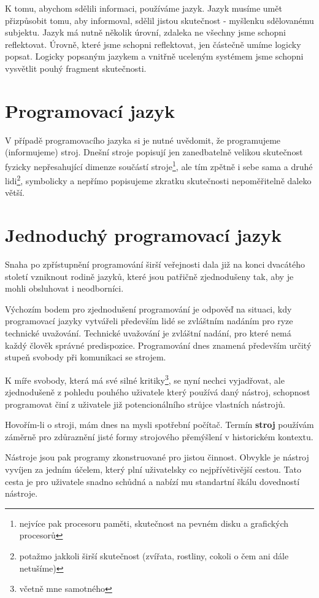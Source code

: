 \documentclass[11pt]{book}
\newcommand{\oddil}[1]{\section{#1}\label{sec:#1}}
\newcommand{\slovnik}[1]{\textbf{\gls{#1}}\index{#1}}
\begin{document}
K tomu, abychom sdělili informaci, používáme jazyk. Jazyk musíme umět přizpůsobit tomu, aby informoval, sdělil jistou skutečnost - myšlenku sdělovanému subjektu. Jazyk má nutně několik úrovní, zdaleka ne všechny jsme schopni reflektovat. Úrovně, které jsme schopni reflektovat, jen částečně umíme logicky popsat. Logicky popsaným jazykem a vnitřně uceleným systémem jsme schopni vysvětlit pouhý fragment skutečnosti.


\oddil{Programovací jazyk}

V případě programovacího jazyka si je nutné uvědomit, že programujeme (informujeme) stroj. Dnešní stroje popisují jen zanedbatelně velikou skutečnost fyzicky nepřesahující dimenze součástí stroje\footnote{nejvíce pak procesoru paměti, skutečnost na pevném disku a grafických procesorů}, ale tím zpětně i sebe sama a druhé lidi\footnote{potažmo jakkoli širší skutečnost (zvířata, rostliny, cokoli o čem ani dále netušíme)}, symbolicky a nepřímo popisujeme zkratku skutečnosti nepoměřitelně daleko větší.



\oddil{Jednoduchý programovací jazyk}

Snaha po  zpřístupnění programování širší veřejnosti dala již na konci dvacátého století vzniknout rodině jazyků, které jsou patřičně zjednodušeny tak, aby je mohli obsluhovat i neodborníci.

Výchozím bodem pro zjednodušení programování je odpověď na situaci, kdy programovací jazyky vytvářeli především lidé se zvláštním nadáním pro ryze technické uvažování. Technické uvažování je zvláštní nadání, pro které nemá každý člověk správné predispozice. Programování dnes znamená především určitý stupeň svobody při komunikaci se strojem.

K míře svobody, která má své silné kritiky\footnote{včetně mne samotného}, se nyní nechci vyjadřovat, ale zjednodušeně z pohledu pouhého uživatele který používá daný nástroj, schopnost programovat činí z uživatele již potencionálního strůjce vlastních nástrojů.

Hovořím-li o stroji, mám dnes na mysli spotřební počítač. Termín \slovnik{stroj} používám záměrně pro zdůraznění jisté formy strojového přemýšlení v historickém kontextu.

Nástroje jsou pak programy zkonstruované pro jistou činnost. Obvykle je nástroj vyvíjen za jedním účelem, který plní uživatelsky co nejpřívětivější cestou. Tato cesta je pro uživatele snadno schůdná a nabízí mu standartní škálu dovedností nástroje.
\end{document}
